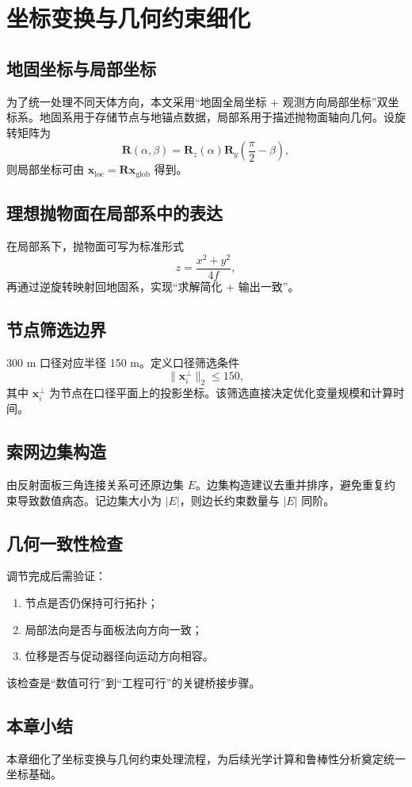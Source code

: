 \chapter{坐标变换与几何约束细化}

\section{地固坐标与局部坐标}
为了统一处理不同天体方向，本文采用“地固全局坐标 + 观测方向局部坐标”双坐标系。地固系用于存储节点与地锚点数据，局部系用于描述抛物面轴向几何。设旋转矩阵为
\[
\mathbf R(\alpha,\beta)=\mathbf R_z(\alpha)\mathbf R_y\!\left(\frac{\pi}{2}-\beta\right),
\]
则局部坐标可由 $\mathbf x_{\text{loc}}=\mathbf R\mathbf x_{\text{glob}}$ 得到。

\section{理想抛物面在局部系中的表达}
在局部系下，抛物面可写为标准形式
\[
z=\frac{x^2+y^2}{4f},
\]
再通过逆旋转映射回地固系，实现“求解简化 + 输出一致”。

\section{节点筛选边界}
300 m 口径对应半径 150 m。定义口径筛选条件
\[
\|\mathbf x_i^\perp\|_2\le150,
\]
其中 $\mathbf x_i^\perp$ 为节点在口径平面上的投影坐标。该筛选直接决定优化变量规模和计算时间。

\section{索网边集构造}
由反射面板三角连接关系可还原边集 $E$。边集构造建议去重并排序，避免重复约束导致数值病态。记边集大小为 $|E|$，则边长约束数量与 $|E|$ 同阶。

\section{几何一致性检查}
调节完成后需验证：
\begin{enumerate}
  \item 节点是否仍保持可行拓扑；
  \item 局部法向是否与面板法向方向一致；
  \item 位移是否与促动器径向运动方向相容。
\end{enumerate}
该检查是“数值可行”到“工程可行”的关键桥接步骤。

\section{本章小结}
本章细化了坐标变换与几何约束处理流程，为后续光学计算和鲁棒性分析奠定统一坐标基础。
